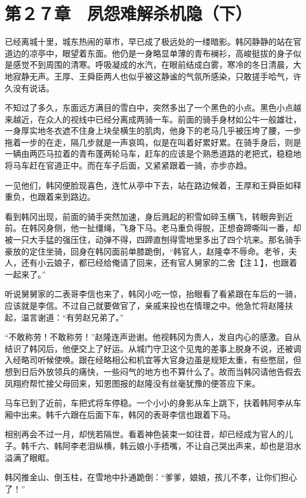 \section{第２７章　夙怨难解杀机隐（下）}

已经离城十里，城东热闹的草市，早已成了极远处的一缕暗影。韩冈静静的站在官道边的凉亭中，眼望着东面。他仍是一身略显单薄的青布襕衫，高峻挺拔的身子似是感觉不到周围的清寒。呼吸凝成的水汽，在眼前结成白雾，寒冷的冬日清晨，大地寂静无声。王厚、王舜臣两人也似乎被这静谧的气氛所感染，只敢搓手哈气，许久没有说话。

不知过了多久，东面远方满目的雪白中，突然多出了一个黑色的小点。黑色小点越来越近，在众人的视线中已经分离成两骑一车。前面的骑手身材如公牛一般雄壮，一身厚实地冬衣遮不住身上块垒横生的肌肉，他身下的老马几乎被压垮了腰，一步拖着一步的在走，隔几步就是一声哀鸣，似是在叫着好累好累。在骑手身后，则是一辆由两匹马拉着的青布蓬两轮马车，赶车的应该是个熟悉道路的老把式，稳稳地将马车赶在官道正中。而在车子后面，又紧紧跟着一骑，亦步亦趋。

一见他们，韩冈便脸现喜色，连忙从亭中下去，站在路边候着，王厚和王舜臣如释重负，也跟着来到路边。

看到韩冈出现，前面的骑手突然加速，身后溅起的积雪如碎玉横飞，转眼奔到近前。在韩冈身侧，他一扯缰绳，飞身下马。老马重负得脱，正想奋蹄嘶叫一番，却被一只大手猛的强压住，动弹不得，四蹄直刨得雪地里多出了四个坑来。那名骑手豪放的定住坐骑，回身在韩冈面前单膝跪倒，“韩官人，赵隆幸不辱命。老爷，夫人，还有小云娘子，都已经给俺请了回来，还有官人舅家的二舍【注１】，也跟着一起来了。”

听说舅舅家的二表哥李信也来了，韩冈小吃一惊，抬眼看了看紧跟在车后的一骑，应该就是李信。不过自己就要做官了，亲戚来投也在情理之中。他急忙将赵隆扶起，温言谢道：“有劳赵兄弟了。”

“不敢称劳！不敢称劳！”赵隆连声逊谢。他视韩冈为贵人，发自内心的感激。自从结识了韩冈后，他便交上了好运。从城门守卫这个见鬼的差事上脱身不说，还被调入经略司听候使唤。跟在经略相公和机宜等大官身边虽是规矩太重，有些憋屈，但想到日后外放领兵的痛快，一些闷气的地方也不算什么了。故而当韩冈请他告假去凤翔府帮忙接父母回来，知恩图报的赵隆没有丝毫犹豫的便答应下来。

马车已到了近前，车把式将车停稳。一个小小的身影从车上跳下，扶着韩阿李从车厢中出来。韩千六跟在后面下车，韩冈的表哥李信也跟着下马。

相别再会不过一月，却恍若隔世。看着神色装束一如往昔，却已经成为官人的儿子。韩千六、韩阿李老泪纵横，韩云娘小手捂嘴，不让自己哭出声来，却也是泪水溢满了眼眶。

韩冈推金山、倒玉柱，在雪地中扑通跪倒：“爹爹，娘娘，孩儿不孝，让你们担心了！”

